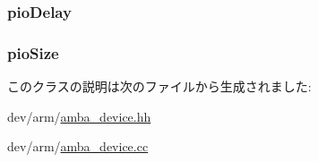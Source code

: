 \label{classAmbaDmaDevice_afa7a5450c2bc6f73bc056050c9177193}
\hypertarget{classAmbaDmaDevice_ac8e969635a78ab9ab123904ccca434cc}{
\subsubsection[{pioDelay}]{ {\bf pioDelay}}}
\label{classAmbaDmaDevice_ac8e969635a78ab9ab123904ccca434cc}
\hypertarget{classAmbaDmaDevice_a390529fe683187c290621e1822e0d5d1}{
\subsubsection[{pioSize}]{ {\bf pioSize}}}
\label{classAmbaDmaDevice_a390529fe683187c290621e1822e0d5d1}


このクラスの説明は次のファイルから生成されました:\begin{DoxyCompactItemize}
\item 
dev/arm/\hyperlink{amba__device_8hh}{amba\_\-device.hh}\item 
dev/arm/\hyperlink{amba__device_8cc}{amba\_\-device.cc}\end{DoxyCompactItemize}
